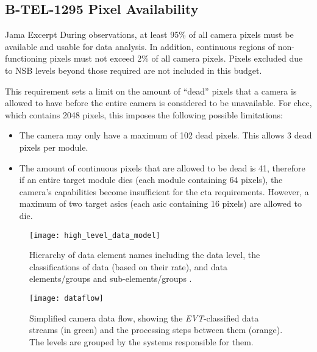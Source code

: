 \subsection{B-TEL-1295 Pixel Availability} \label{section:pixel_availability}

\begin{requirement}{Jama Excerpt}
During observations, at least 95\% of all camera pixels must be available and usable for data analysis. In addition, continuous regions of non-functioning pixels must not exceed 2\% of all camera pixels. Pixels excluded due to NSB levels beyond those required are not included in this budget.
\end{requirement}

This requirement sets a limit on the amount of ``dead'' pixels that a camera is allowed to have before the entire camera is considered to be unavailable. For \gls{chec}, which contains 2048 pixels, this imposes the following possible limitations:
\begin{itemize}
\item The camera may only have a maximum of 102 dead pixels. This allows 3 dead pixels per module.
\item The amount of continuous pixels that are allowed to be dead is 41, therefore if an entire \gls{target} module dies (each module containing 64 pixels), the camera's capabilities become insufficient for the \gls{cta} requirements. However, a maximum of two \gls{target} \glspl{asic} (each \gls{asic} containing 16 pixels) are allowed to die.
\end{itemize}

\begin{figure}
 	\centering
  	\texttt{[image: high\_level\_data\_model]} 
	\caption[High-level data model hierarchy.]{Hierarchy of data element names including the data level, the classifications of data (based on their rate), and data elements/groups and sub-elements/groups \cite{Kosack2017}.}
	\label{fig:high_level_data_model}
\end{figure}

\begin{figure}
 	\centering
  	\texttt{[image: dataflow]} 
	\caption[Simplified camera data flow.]{Simplified camera data flow, showing the \textit{EVT}-classified data streams (in green) and the processing steps between them (orange). The levels are grouped by the systems responsible for them.}
	\label{fig:dataflow}
\end{figure}


